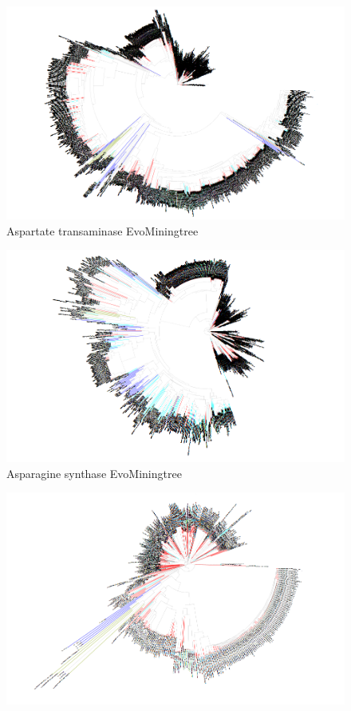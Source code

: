 \documentclass[12pt,twoside]{reedthesis}
\begin{document}
\begin{figure}[h!tbp]
  \includegraphics[angle = 180,scale = 0.25]{chapter2/Cyanobacteria/tree16.png}
  \caption[Aspartate transaminase EvoMiningtree]{\normalsize{Aspartate transaminase EvoMiningtree}}
  \label{fig:Aspartate_transaminase_evo_tree}
  \end{figure}\begin{figure}[h!tbp]
  \centering
  \includegraphics[angle = 180,scale = 0.25]{chapter2/Cyanobacteria/tree17.png}
  \caption[Asparagine synthase EvoMiningtree]{\normalsize{Asparagine synthase EvoMiningtree}}
  \label{fig:Asparagine_synthase_evo_tree}
  \end{figure}\begin{figure}[h!tbp]
  \centering
  \includegraphics[angle = 180,scale = 0.25]{chapter2/Cyanobacteria/tree18.png}

\end{figure}
\end{document}
